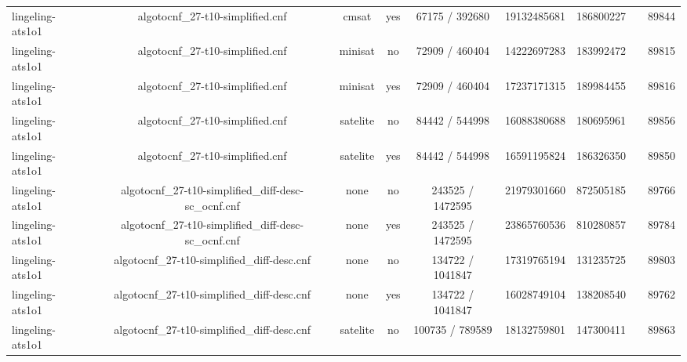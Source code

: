 \begin{appendices}
\begin{table}[p]
\begin{center}
\begin{tabular}{l|cccccccc}
  lingeling-ats1o1               & algotocnf\_27-t10-simplified.cnf & cmsat      & yes   & 67175 / 392680 & 19132485681 & 186800227 &            & 89844 \\ %
  lingeling-ats1o1               & algotocnf\_27-t10-simplified.cnf & minisat    & no    & 72909 / 460404 & 14222697283 & 183992472 &            & 89815 \\ %
  lingeling-ats1o1               & algotocnf\_27-t10-simplified.cnf & minisat    & yes   & 72909 / 460404 & 17237171315 & 189984455 &            & 89816 \\ %
  lingeling-ats1o1               & algotocnf\_27-t10-simplified.cnf & satelite   & no    & 84442 / 544998 & 16088380688 & 180695961 &            & 89856 \\ %
  lingeling-ats1o1               & algotocnf\_27-t10-simplified.cnf & satelite   & yes   & 84442 / 544998 & 16591195824 & 186326350 &            & 89850 \\ %
  lingeling-ats1o1               & algotocnf\_27-t10-simplified\_diff-desc-sc\_ocnf.cnf & none       & no    & 243525 / 1472595 & 21979301660 & 872505185 &            & 89766 \\ %
  lingeling-ats1o1               & algotocnf\_27-t10-simplified\_diff-desc-sc\_ocnf.cnf & none       & yes   & 243525 / 1472595 & 23865760536 & 810280857 &            & 89784 \\ %
  lingeling-ats1o1               & algotocnf\_27-t10-simplified\_diff-desc.cnf & none       & no    & 134722 / 1041847 & 17319765194 & 131235725 &            & 89803 \\ %
  lingeling-ats1o1               & algotocnf\_27-t10-simplified\_diff-desc.cnf & none       & yes   & 134722 / 1041847 & 16028749104 & 138208540 &            & 89762 \\ %
  lingeling-ats1o1               & algotocnf\_27-t10-simplified\_diff-desc.cnf & satelite   & no    & 100735 / 789589 & 18132759801 & 147300411 &            & 89863 \\ %

\end{tabular}
\end{center}
\end{table}
\end{appendices}
